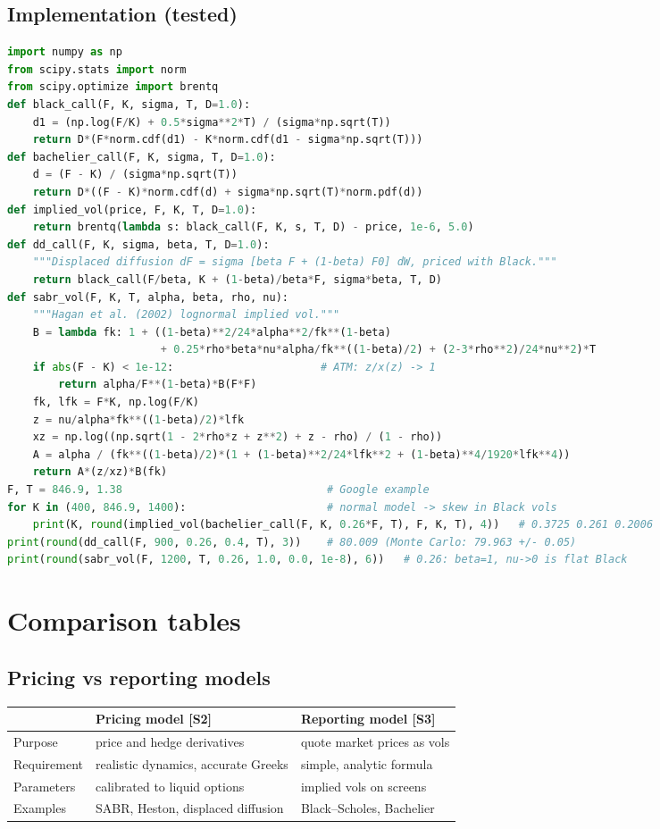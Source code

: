 \documentclass[10pt]{article}
\begin{document}
\subsection{Implementation \beyond{} (tested)}
\begin{lstlisting}[language=Python]
import numpy as np
from scipy.stats import norm
from scipy.optimize import brentq
def black_call(F, K, sigma, T, D=1.0):
    d1 = (np.log(F/K) + 0.5*sigma**2*T) / (sigma*np.sqrt(T))
    return D*(F*norm.cdf(d1) - K*norm.cdf(d1 - sigma*np.sqrt(T)))
def bachelier_call(F, K, sigma, T, D=1.0):
    d = (F - K) / (sigma*np.sqrt(T))
    return D*((F - K)*norm.cdf(d) + sigma*np.sqrt(T)*norm.pdf(d))
def implied_vol(price, F, K, T, D=1.0):
    return brentq(lambda s: black_call(F, K, s, T, D) - price, 1e-6, 5.0)
def dd_call(F, K, sigma, beta, T, D=1.0):
    """Displaced diffusion dF = sigma [beta F + (1-beta) F0] dW, priced with Black."""
    return black_call(F/beta, K + (1-beta)/beta*F, sigma*beta, T, D)
def sabr_vol(F, K, T, alpha, beta, rho, nu):
    """Hagan et al. (2002) lognormal implied vol."""
    B = lambda fk: 1 + ((1-beta)**2/24*alpha**2/fk**(1-beta)
                        + 0.25*rho*beta*nu*alpha/fk**((1-beta)/2) + (2-3*rho**2)/24*nu**2)*T
    if abs(F - K) < 1e-12:                       # ATM: z/x(z) -> 1
        return alpha/F**(1-beta)*B(F*F)
    fk, lfk = F*K, np.log(F/K)
    z = nu/alpha*fk**((1-beta)/2)*lfk
    xz = np.log((np.sqrt(1 - 2*rho*z + z**2) + z - rho) / (1 - rho))
    A = alpha / (fk**((1-beta)/2)*(1 + (1-beta)**2/24*lfk**2 + (1-beta)**4/1920*lfk**4))
    return A*(z/xz)*B(fk)
F, T = 846.9, 1.38                                # Google example
for K in (400, 846.9, 1400):                      # normal model -> skew in Black vols
    print(K, round(implied_vol(bachelier_call(F, K, 0.26*F, T), F, K, T), 4))   # 0.3725 0.261 0.2006
print(round(dd_call(F, 900, 0.26, 0.4, T), 3))    # 80.009 (Monte Carlo: 79.963 +/- 0.05)
print(round(sabr_vol(F, 1200, T, 0.26, 1.0, 0.0, 1e-8), 6))   # 0.26: beta=1, nu->0 is flat Black
\end{lstlisting}

\section{Comparison tables}
\subsection{Pricing vs reporting models}
{\small\begin{tabularx}{\linewidth}{@{}l X X@{}}\toprule
 & Pricing model [S2] & Reporting model [S3]\\\midrule
Purpose & price and hedge derivatives & quote market prices as vols\\
Requirement & realistic dynamics, accurate Greeks & simple, analytic formula\\
Parameters & calibrated to liquid options & implied vols on screens\\
Examples & SABR, Heston, displaced diffusion & Black--Scholes, Bachelier\\\bottomrule
\end{tabularx}}
\end{document}

